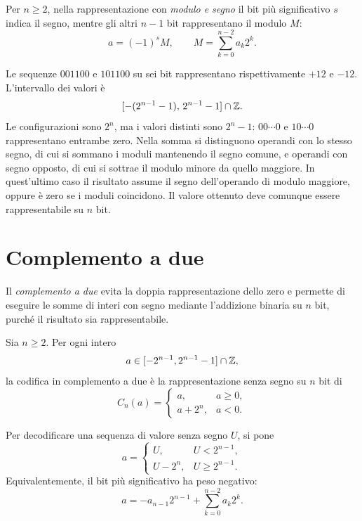 \begin{definition}
Per \(n\ge2\), nella rappresentazione con \emph{modulo e segno} il bit
più significativo \(s\) indica il segno, mentre gli altri \(n-1\) bit
rappresentano il modulo \(M\):
\[
  a=(-1)^sM,\qquad
  M=\sum_{k=0}^{n-2}a_k2^k.
\]
\end{definition}

Le sequenze \(001100\) e \(101100\) su sei bit rappresentano
rispettivamente \(+12\) e \(-12\). L'intervallo dei valori è
\[
  [-(2^{n-1}-1),\,2^{n-1}-1]\cap\mathbb{Z}.
\]
Le configurazioni sono \(2^n\), ma i valori distinti sono \(2^n-1\):
\(00\cdots0\) e \(10\cdots0\) rappresentano entrambe zero.
Nella somma si distinguono operandi con lo stesso segno, di cui si
sommano i moduli mantenendo il segno comune, e operandi con segno
opposto, di cui si sottrae il modulo minore da quello maggiore.
In quest'ultimo caso il risultato assume il segno dell'operando
di modulo maggiore, oppure è zero se i moduli coincidono.
Il valore ottenuto deve comunque essere rappresentabile su \(n\) bit.

\section{Complemento a due}
\label{sec:fi-complemento-due}

Il \emph{complemento a due} evita la doppia rappresentazione dello zero
e permette di eseguire le somme di interi con segno mediante
l'addizione binaria su \(n\) bit, purché il risultato sia rappresentabile.

\begin{definition}
\label{def:fi-complemento-due}
Sia \(n\ge2\). Per ogni intero
\[
  a\in[-2^{n-1},2^{n-1}-1]\cap\mathbb{Z},
\]
la codifica in complemento a due è la rappresentazione senza segno
su \(n\) bit di
\[
  C_n(a)=
  \begin{cases}
    a, & a\ge0,\\
    a+2^n, & a<0.
  \end{cases}
\]
\end{definition}

Per decodificare una sequenza di valore senza segno \(U\), si pone
\[
  a=\begin{cases}
    U, & U<2^{n-1},\\
    U-2^n, & U\ge2^{n-1}.
  \end{cases}
\]
Equivalentemente, il bit più significativo ha peso negativo:
\begin{equation}
  a=-a_{n-1}2^{n-1}+\sum_{k=0}^{n-2}a_k2^k.
  \label{eq:fi-pesi-complemento-due}
\end{equation}

